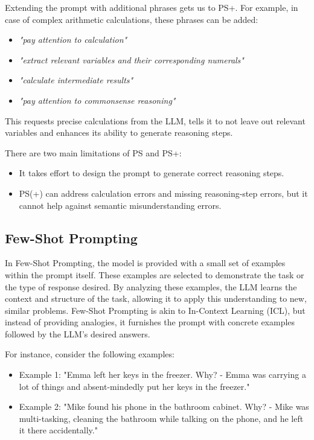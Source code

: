 \documentclass[fleqn,moreauthors,10pt]{ds_report}
\begin{document}
Extending the prompt with additional phrases gets us to PS+. For example, in case of complex arithmetic calculations, these phrases can be added:
\begin{itemize}
    \item \textit{"pay attention to calculation"}
    \item \textit{"extract relevant variables and their corresponding numerals"}
    \item \textit{"calculate intermediate results"}
    \item \textit{"pay attention to commonsense reasoning"}
\end{itemize}

This requests precise calculations from the LLM, tells it to not leave out relevant variables and enhances its ability to generate reasoning steps.
\newline

There are two main limitations of PS and PS+:
\begin{itemize}
    \item It takes effort to design the prompt to generate correct reasoning steps.
    \item PS(+) can address calculation errors and missing reasoning-step errors, but it cannot help against semantic misunderstanding errors. \cite{ps}
\end{itemize}

\subsection*{Few-Shot Prompting}

In Few-Shot Prompting, the model is provided with a small set of examples within the prompt itself. These examples are selected to demonstrate the task or the type of response desired. By analyzing these examples, the LLM learns the context and structure of the task, allowing it to apply this understanding to new, similar problems. Few-Shot Prompting is akin to In-Context Learning (ICL), but instead of providing analogies, it furnishes the prompt with concrete examples followed by the LLM's desired answers. 

For instance, consider the following examples:
\begin{itemize}
    \item Example 1: "Emma left her keys in the freezer. Why? - Emma was carrying a lot of things and absent-mindedly put her keys in the freezer."
    \item Example 2: "Mike found his phone in the bathroom cabinet. Why? - Mike was multi-tasking, cleaning the bathroom while talking on the phone, and he left it there accidentally."
\end{itemize}
\end{document}
